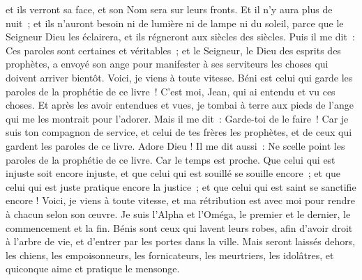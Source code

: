 \begin{multicols}{2}
et ils verront sa face, et son Nom sera sur leurs fronts.
Et il n'y aura plus de nuit~; et ils n'auront besoin ni de lumière ni de lampe ni du soleil, parce que le Seigneur Dieu les éclairera, et ils régneront aux siècles des siècles.
Puis il me dit~: Ces paroles sont certaines et véritables~; et le Seigneur, le Dieu des esprits des prophètes, a envoyé son ange pour manifester à ses serviteurs les choses qui doivent arriver bientôt.
Voici, je viens à toute vitesse. Béni est celui qui garde les paroles de la prophétie de ce livre~!
C'est moi, Jean, qui ai entendu et vu ces choses. Et après les avoir entendues et vues, je tombai à terre aux pieds de l'ange qui me les montrait pour l'adorer.
Mais il me dit~: Garde-toi de le faire~! Car je suis ton compagnon de service, et celui de tes frères les prophètes, et de ceux qui gardent les paroles de ce livre. Adore Dieu !
Il me dit aussi~: Ne scelle point les paroles de la prophétie de ce livre. Car le temps est proche.
Que celui qui est injuste soit encore injuste, et que celui qui est souillé se souille encore~; et que celui qui est juste pratique encore la justice~; et que celui qui est saint se sanctifie encore !
Voici, je viens à toute vitesse, et ma rétribution est avec moi pour rendre à chacun selon son œuvre.
Je suis l'Alpha et l'Oméga, le premier et le dernier, le commencement et la fin.
Bénis sont ceux qui lavent leurs robes, afin d'avoir droit à l'arbre de vie, et d'entrer par les portes dans la ville.
Mais seront laissés dehors, les chiens, les empoisonneurs, les fornicateurs, les meurtriers, les idolâtres, et quiconque aime et pratique le mensonge.

\end{multicols}
